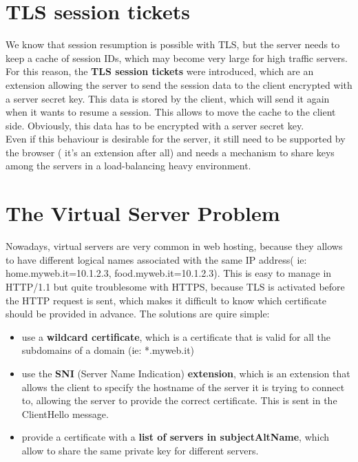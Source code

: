 \section{TLS session tickets}
We know that session resumption is possible with TLS, but the server
needs to keep a cache of session IDs, which may become very large for
high traffic servers. For this reason, the \textbf{TLS session
tickets} were introduced, which are an extension allowing the server
to send the session data to the client encrypted with a server secret
key. This data is stored by the client, which will send it again when
it wants to resume a session. This allows to move the cache to the
client side. Obviously, this data has to be encrypted with a server
secret key.\\
Even if this behaviour is desirable for the server, it still need to
be supported by the browser ( it's an extension after all) and needs a
mechanism to share keys among the servers in a load-balancing heavy
environment.
\section{The Virtual Server Problem}
Nowadays, virtual servers are very common in web hosting, because they
allows to have different logical names associated with the same IP
address( ie: home.myweb.it=10.1.2.3, food.myweb.it=10.1.2.3).
This is easy to manage in HTTP/1.1 but quite troublesome with HTTPS,
because TLS is activated before the HTTP request is sent, which makes
it difficult to know which certificate should be provided in advance.
The solutions are quire simple:
\begin{itemize}
  \item use a \textbf{wildcard certificate}, which is a certificate
    that is valid for all the subdomains of a domain (ie: *.myweb.it)
  \item use the \textbf{SNI} (Server Name Indication)
    \textbf{extension}, which is an extension that allows the client
    to specify the hostname of the server it is trying to connect to,
    allowing the server to provide the correct certificate. This is
    sent in the ClientHello message.
  \item provide a certificate with a \textbf{list of servers in
    subjectAltName}, which allow to share the same private key for
    different servers.
\end{itemize}

